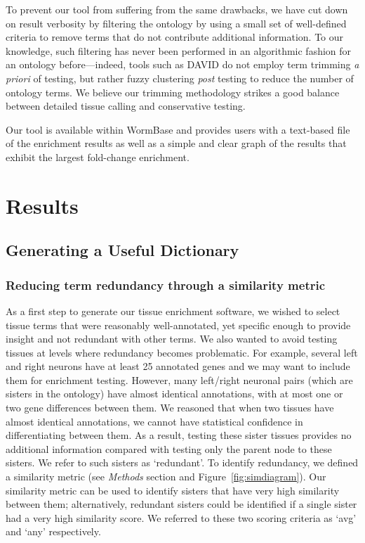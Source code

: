 \documentclass{bmcart}
\begin{document}
	To prevent our tool from suffering from the same drawbacks, we have cut down on result verbosity by filtering the ontology by using a small set of well-defined criteria to remove terms that do not contribute additional information. To our knowledge, such filtering has never been performed in an algorithmic fashion for an ontology before---indeed, tools such as DAVID do not employ term trimming \emph{a priori} of testing, but rather fuzzy clustering \emph{post} testing to reduce the number of ontology terms. We believe our trimming methodology strikes a good balance between detailed tissue calling and conservative testing.	

	Our tool is available within WormBase and provides users with a text-based file of the enrichment results as well as a simple and clear graph of the results that exhibit the largest fold-change enrichment.

\section*{Results}
\subsection*{Generating a Useful Dictionary}
\subsubsection*{Reducing term redundancy through a similarity metric}
As a first step to generate our tissue enrichment software, we wished to select tissue terms that were reasonably well-annotated, yet specific enough to provide insight and not redundant with other terms. We also wanted to avoid testing tissues at levels where redundancy becomes problematic. For example, several left and right neurons have at least 25 annotated genes and we may want to include them for enrichment testing. However, many left/right neuronal pairs (which are sisters in the ontology) have almost identical annotations, with at most one or two gene differences between them. We reasoned that when two tissues have almost identical annotations, we cannot have statistical confidence in differentiating between them. As a result, testing these sister tissues provides no additional information compared with testing only the parent node to these sisters. We refer to such sisters as `redundant'. To identify redundancy, we defined a similarity metric (see \emph{Methods} section and Figure~\ref{fig:simdiagram}). Our similarity metric can be used to identify sisters that have very high similarity between them; alternatively, redundant sisters could be identified if a single sister had a very high similarity score. We referred to these two scoring criteria as `avg' and `any' respectively. 
\end{document}
